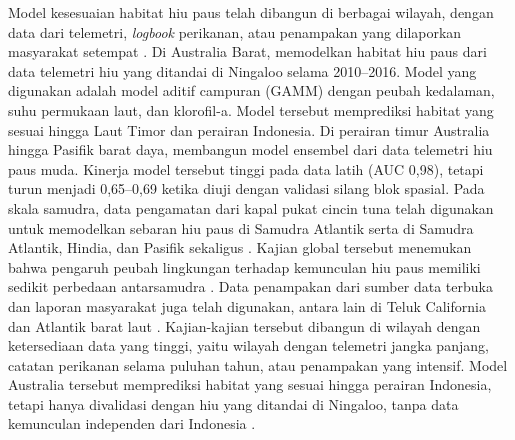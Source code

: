 Model kesesuaian habitat hiu paus telah dibangun di berbagai wilayah, dengan
data dari telemetri, \textit{logbook} perikanan, atau penampakan yang
dilaporkan masyarakat setempat \citep{Reynolds2017,Sequeira2014,Milles2025}. Di
Australia Barat, \citet{Reynolds2017} memodelkan habitat hiu paus dari data
telemetri hiu yang ditandai di Ningaloo selama 2010--2016. Model yang
digunakan adalah model aditif campuran (GAMM) dengan peubah kedalaman, suhu
permukaan laut, dan klorofil-a. Model tersebut memprediksi habitat yang sesuai
hingga Laut Timor dan perairan Indonesia.
Di perairan timur Australia hingga Pasifik barat daya, \citet{Miller2026}
membangun model ensembel dari data telemetri hiu paus muda. Kinerja model
tersebut tinggi pada data latih (AUC 0,98), tetapi turun menjadi 0,65--0,69
ketika diuji dengan validasi silang blok spasial. Pada skala samudra, data
pengamatan dari kapal pukat cincin tuna telah digunakan untuk memodelkan
sebaran hiu paus di Samudra Atlantik \citep{Baez2020} serta di Samudra
Atlantik, Hindia, dan Pasifik sekaligus \citep{Sequeira2014}. Kajian global
tersebut menemukan bahwa pengaruh peubah lingkungan terhadap kemunculan hiu
paus memiliki sedikit perbedaan antarsamudra \citep{Sequeira2014}. Data penampakan dari
sumber data terbuka dan laporan masyarakat juga telah digunakan, antara lain di
Teluk California \citep{PetatanRamirez2020} dan Atlantik barat laut
\citep{Milles2025}. Kajian-kajian tersebut dibangun di wilayah dengan
ketersediaan data yang tinggi, yaitu wilayah dengan telemetri jangka panjang,
catatan perikanan selama puluhan tahun, atau penampakan yang intensif.
Model Australia tersebut memprediksi habitat yang sesuai hingga perairan
Indonesia, tetapi hanya divalidasi dengan hiu yang ditandai di Ningaloo, tanpa
data kemunculan independen dari Indonesia \citep{Reynolds2017}.

